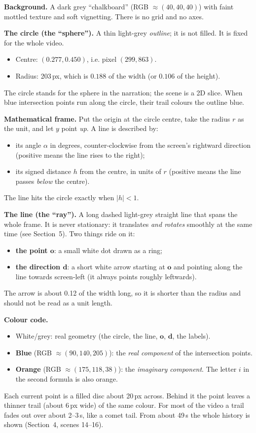 \documentclass[10pt,a4paper]{article}
\newcommand{\vo}{\mathbf{o}}\newcommand{\vd}{\mathbf{d}}\newcommand{\vp}{\mathbf{p}}
\begin{document}
\textbf{Background.} A dark grey ``chalkboard'' (RGB $\approx(40,40,40)$) with faint mottled texture and soft vignetting. There is no grid and no axes.

\textbf{The circle (the ``sphere'').} A thin light-grey \emph{outline}; it is not filled. It is fixed for the whole video.
\begin{itemize}
\item Centre: $(0.277,0.450)$, i.e. pixel $(299,863)$.
\item Radius: 203\,px, which is $0.188$ of the width (or $0.106$ of the height).
\end{itemize}
The circle stands for the sphere in the narration; the scene is a 2D slice. When blue intersection points run along the circle, their trail colours the outline blue.

\textbf{Mathematical frame.} Put the origin at the circle centre, take the radius $r$ as the unit, and let $y$ point \emph{up}. A line is described by:
\begin{itemize}
\item its angle $\alpha$ in degrees, counter-clockwise from the screen's rightward direction (positive means the line rises to the right);
\item its signed distance $h$ from the centre, in units of $r$ (positive means the line passes \emph{below} the centre).
\end{itemize}
The line hits the circle exactly when $|h|<1$.

\textbf{The line (the ``ray'').} A long dashed light-grey straight line that spans the whole frame. It is never stationary: it translates \emph{and rotates} smoothly at the same time (see Section~5). Two things ride on it:
\begin{itemize}
\item \textbf{the point $\vo$}: a small white dot drawn as a ring;
\item \textbf{the direction $\vd$}: a short white arrow starting at $\vo$ and pointing along the line towards screen-left (it always points roughly leftwards).
\end{itemize}
The arrow is about 0.12 of the width long, so it is shorter than the radius and should not be read as a unit length.

\textbf{Colour code.}
\begin{itemize}
\item White/grey: real geometry (the circle, the line, $\vo$, $\vd$, the labels).
\item \textcolor{blue!70!cyan}{\textbf{Blue}} (RGB $\approx(90,140,205)$): the \emph{real component} of the intersection points.
\item \textcolor{orange!90!black}{\textbf{Orange}} (RGB $\approx(175,118,38)$): the \emph{imaginary component}. The letter $i$ in the second formula is also orange.
\end{itemize}
Each current point is a filled disc about 20\,px across. Behind it the point leaves a thinner trail (about 6\,px wide) of the same colour. For most of the video a trail fades out over about 2--3\,s, like a comet tail. From about 49\,s the whole history is shown (Section~4, scenes 14--16).
\end{document}
